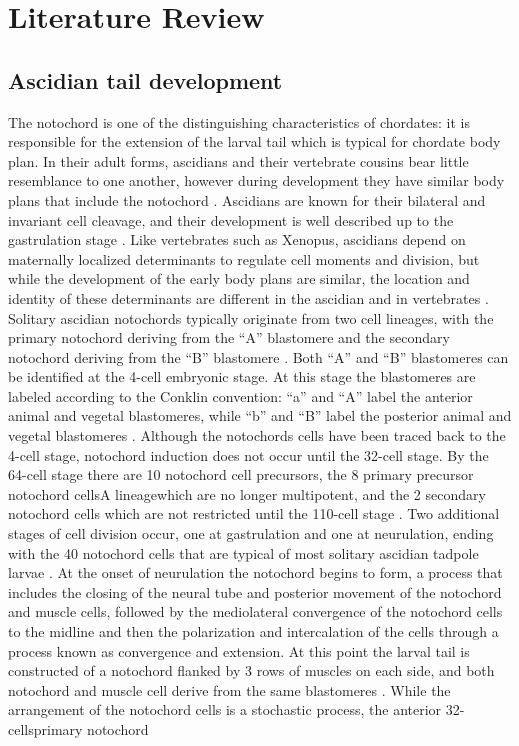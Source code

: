 \chapter{Literature Review}
\section{Ascidian tail development}

The notochord is one of the distinguishing characteristics of chordates: it is responsible for the extension of the larval tail which is typical for chordate body plan. In their adult forms, ascidians and their vertebrate cousins bear little resemblance to one another, however during development they have similar body plans that include the notochord \cite{jeffery_minireview_2002}. Ascidians are known for their bilateral and invariant cell cleavage, and their development is well described up to the gastrulation stage \cite{nishida_cell_1983,nishida_cell_1985,nishida_cell_1987}. Like vertebrates such as Xenopus, ascidians depend on maternally localized determinants to regulate cell moments and division, but while the development of the early body plans are similar, the location and identity of these determinants are different in the ascidian and in vertebrates \cite{lemaire_ascidians_2008}. Solitary ascidian notochords typically originate from two cell lineages, with the primary notochord deriving from the ``A'' blastomere and the secondary notochord deriving from the ``B'' blastomere \cite{nishida_cell_1983}.  Both ``A'' and ``B'' blastomeres can be identified at the 4-cell embryonic stage. At this stage the blastomeres are labeled according to the Conklin convention: ``a'' and ``A'' label the anterior animal and vegetal blastomeres, while ``b'' and ``B'' label the posterior animal and vegetal blastomeres \cite{conklin_organization_1905} . Although the notochords cells have been traced back to the 4-cell stage, notochord induction does not occur until the 32-cell stage. By the 64-cell stage there are 10 notochord cell precursors, the 8 primary precursor notochord cells\textemdash A lineage\textemdash which are no longer multipotent, and the 2 secondary notochord cells which are not restricted until the 110-cell stage \cite{nishida_cell_1985,yasuo_ascidian_1994,yasuo_conservation_1998,lemaire_unfolding_2009}. Two additional stages of cell division occur, one at gastrulation and one at neurulation, ending with the 40 notochord cells that are typical of most solitary ascidian tadpole larvae \cite{conklin_organization_1905}. At the onset of neurulation the notochord begins to form, a process that includes the closing of the neural tube and posterior movement of the notochord and muscle cells, followed by the mediolateral convergence of the notochord cells to the midline and then the polarization and intercalation of the cells through a process known as convergence and extension\cite{swalla_mechanisms_1993}. At this point the larval tail is constructed of a notochord flanked by 3 rows of muscles on each side, and both notochord and muscle cell derive from the same blastomeres \cite{nishida_cell_1985}. While the arrangement of the notochord cells is a stochastic process, the anterior 32-cells\textemdash primary notochord 